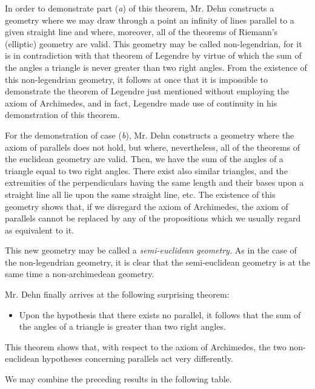 \documentclass[11pt,oneside]{book}
\begin{document}
In order to demonstrate part (\emph{a}) of this theorem,
Mr. Dehn constructs a geometry where we may draw
through a point an infinity of lines parallel to a given
straight line and where, moreover, all of the theorems
of Riemann's (elliptic) geometry are valid. This geometry
may be called non-legendrian, for it is in contradiction
with that theorem of Legendre by virtue of
which the sum of the angles a triangle is never greater
than two right angles. From the existence of this
non-legendrian geometry, it follows at once that it is
impossible to demonstrate the theorem of Legendre
just mentioned without employing the axiom of Archimedes,
and in fact, Legendre made use of continuity
in his demonstration of this theorem.

For the demonstration of case (\emph{b}), Mr. Dehn constructs
a geometry where the axiom of parallels does
not hold, but where, nevertheless, all of the theorems
of the euclidean geometry are valid. Then, we have
the sum of the angles of a triangle equal to two right
angles. There exist also similar triangles, and the extremities
of the perpendiculars having the same length
and their bases upon a straight line all lie upon the
same straight line, etc. The existence of this geometry
shows that, if we disregard the axiom of Archimedes,
the axiom of parallels cannot be replaced by
any of the propositions which we usually regard as
equivalent to it.

This new geometry may be called a \textit{semi-euclidean}
\textit{geometry.} As in the case of the non-legendrian geometry,
it is clear that the semi-euclidean geometry is at
the same time a non-archimedean geometry.

Mr. Dehn finally arrives at the following surprising
theorem:

\begin{itemize}
\item[] Upon the hypothesis that there exists no parallel,
it follows that the sum of the angles of a triangle
is greater than two right angles.
\end{itemize}

This theorem shows that, with respect to the axiom
of Archimedes, the two non-euclidean hypotheses concerning
parallels act very differently.

We may combine the preceding results in the following table.
\vspace*{4mm}
\end{document}
